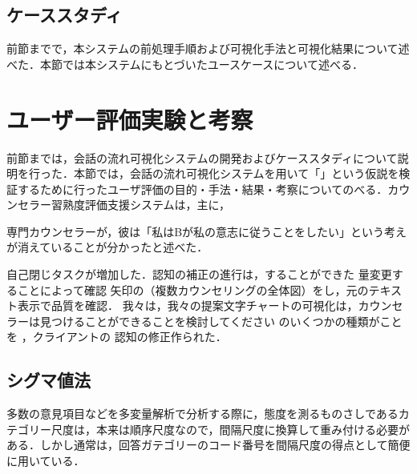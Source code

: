 \documentclass[shuuron]{kuee}
\begin{document}







\subsection{ケーススタディ}

前節までで，本システムの前処理手順および可視化手法と可視化結果について述べた．本節では本システムにもとづいたユースケースについて述べる．

\section{ユーザー評価実験と考察}

前節までは，会話の流れ可視化システムの開発およびケーススタディについて説明を行った．本節では，会話の流れ可視化システムを用いて「」という仮説を検証するために行ったユーザ評価の目的・手法・結果・考察についてのべる．カウンセラー習熟度評価支援システムは，主に，





専門カウンセラーが，彼は「私はBが私の意志に従うことをしたい」という考えが消えていることが分かったと述べた．

自己閉じタスクが増加した．認知の補正の進行は，することができた 量変更することによって確認 矢印の（複数カウンセリングの全体図）をし，元のテキスト表示で品質を確認． 我々は，我々の提案文字チャートの可視化は，カウンセラーは見つけることができることを検討してください のいくつかの種類がことを ，クライアントの 認知の修正作られた．

\subsection{シグマ値法}
多数の意見項目などを多変量解析で分析する際に，態度を測るものさしであるカテゴリー尺度は，本来は順序尺度なので，間隔尺度に換算して重み付ける必要がある．しかし通常は，回答ガテゴリーのコード番号を間隔尺度の得点として簡便に用いている．
\end{document}
